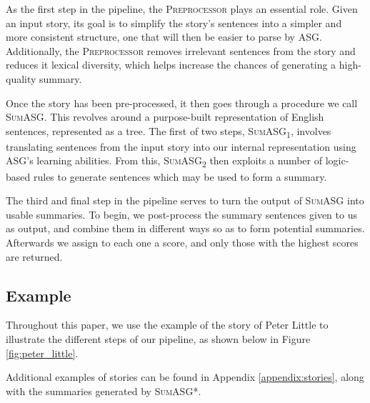 \noindent
As the first step in the pipeline, the \textsc{Preprocessor} plays an essential role. Given an input story, its goal is to simplify the story's sentences into a simpler and more consistent structure, one that will then be easier to parse by ASG. Additionally, the \textsc{Preprocessor} removes irrelevant sentences from the story and reduces it lexical diversity, which helps increase the chances of generating a high-quality summary.

Once the story has been pre-processed, it then goes through a procedure we call \textsc{SumASG}. This revolves around a purpose-built representation of English sentences, represented as a tree. The first of two steps, \textsc{SumASG\textsubscript{1}}, involves translating sentences from the input story into our internal representation using ASG's learning abilities. From this, \textsc{SumASG\textsubscript{2}} then exploits a number of logic-based rules to generate sentences which may be used to form a summary.

The third and final step in the pipeline serves to turn the output of \textsc{SumASG} into usable summaries. To begin, we post-process the summary sentences given to us as output, and combine them in different ways so as to form potential summaries. Afterwards we assign to each one a score, and only those with the highest scores are returned.

\subsection*{Example}

Throughout this paper, we use the example of the story of Peter Little to illustrate the different steps of our pipeline, as shown below in Figure \ref{fig:peter_little}.

Additional examples of stories can be found in Appendix \ref{appendix:stories}, along with the summaries generated by \textsc{SumASG*}.

